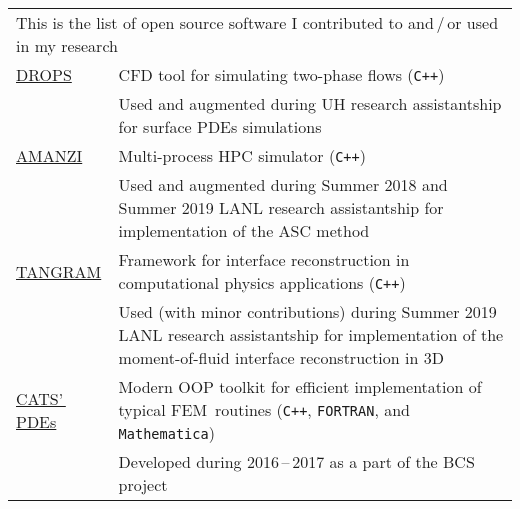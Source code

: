 \documentclass[a4paper,12pt]{article}
\begin{document}
	\begin{longtable}{ l >{\raggedright\arraybackslash}p{15cm} }
		\multicolumn{2}{p{17cm}}{This is the list of open source software I contributed to and\,/\,or used in my research}\vspace{3mm}\\
		\href{https://www.igpm.rwth-aachen.de/DROPS/}{DROPS}
			& CFD tool for simulating two-phase flows (\texttt{C++})\vspace{1mm}\\
			& Used and augmented during UH research assistantship for surface PDEs simulations\vspace{3mm}\\
		\href{https://github.com/amanzi}{AMANZI}
			& Multi-process HPC simulator (\texttt{C++})\vspace{1mm}\\
			& Used and augmented during Summer 2018 and Summer 2019 LANL research assistantship for implementation of the ASC method\vspace{3mm}\\
		\href{https://github.com/laristra/tangram}{TANGRAM}
			& Framework for interface reconstruction in computational physics applications (\texttt{C++})\vspace{1mm}\\
			& Used (with minor contributions) during Summer 2019 LANL research assistantship for implementation of the moment-of-fluid interface reconstruction in 3D\vspace{3mm}\\
		\href{https://github.com/CATSPDEs/}{CATS'\,PDEs}
			& Modern OOP toolkit for efficient implementation of typical FEM~routines (\texttt{C++}, \texttt{FORTRAN}, and \texttt{Mathematica})\vspace{1mm}\\
			& Developed during 2016\,--\,2017 as a part of the BCS project
	\end{longtable}
	
	\vfill
	
	\begin{flushright}
		\small
	\end{flushright}
		
\end{document}

